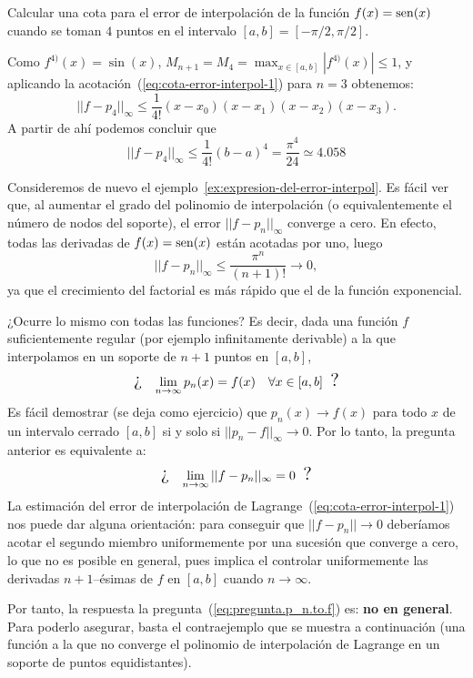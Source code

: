 \begin{example}
  \label{ex:expresion-del-error-interpol}
  Calcular una cota para el error de interpolación de la función
  $f(x)=\operatorname{sen}(x)$ cuando se toman $4$ puntos en el intervalo $[a,b]=[-\pi/2,\pi/2]$.

  Como $f^{4)}(x)=\sin(x)$, $M_{n+1}=M_4=\max_{x\in
    [a,b]}|f^{4)}(x)|\le 1$, y aplicando la
  acotación~(\ref{eq:cota-error-interpol-1}) para $n=3$ obtenemos:
  \begin{equation*}
    ||f-p_4||_\infty \le \frac{1}{4!}(x-x_0)(x-x_1)(x-x_2)(x-x_3).
  \end{equation*}
  A partir de ahí podemos concluir que
  \begin{equation*}
    ||f-p_4||_\infty \le \frac{1}{4!}(b-a)^4 = \frac{\pi^4}{24}
    \simeq 4.058
  \end{equation*}
\end{example}
\begin{remark}
  Consideremos de nuevo el
  ejemplo~\ref{ex:expresion-del-error-interpol}. Es fácil ver que, al
  aumentar el grado del polinomio de interpolación (o equivalentemente
  el número de nodos del soporte), el error $||f-p_n||_\infty$
  converge a cero. En efecto, todas las derivadas de $f(x)=\operatorname{sen}(x)$
  están acotadas por uno, luego
  \begin{equation*}
    ||f-p_n||_\infty\le \frac{\pi^n}{(n+1)!} \to 0,
  \end{equation*}
  ya que el crecimiento del factorial es más rápido que el de la
  función exponencial.

  ¿Ocurre lo mismo con todas las funciones? Es decir, dada una
  función $f$ suficientemente regular (por ejemplo infinitamente
  derivable) a la que interpolamos en un soporte de $n+1$ puntos en
  $[a,b]$,
  \begin{equation}
    \text{\Large ¿ \;}
    \lim_{n\to\infty} p_n(x) = f(x) \quad \forall x\in [a,b]
    \text{\; \Large?}
    \label{eq:pregunta.p_n.to.f}
  \end{equation}
  Es fácil demostrar (se deja como ejercicio) que $p_n(x)\to f(x)$
  para todo $x$ de un intervalo cerrado $[a,b]$ si y solo si $||p_n -
  f||_\infty\to 0$. Por lo tanto, la pregunta anterior es equivalente
  a:
  \begin{equation*}
    \text{\Large ¿ \;}
    \lim_{n\to\infty} ||f-p_n||_\infty=0
    \text{\; \Large ?}
  \end{equation*}
  La estimación del error de interpolación de
  Lagrange~(\ref{eq:cota-error-interpol-1}) nos puede dar alguna
  orientación: para conseguir que
  $||f-p_n||\to 0$ deberíamos acotar el segundo miembro uniformemente
  por una sucesión que converge a cero, lo que no es posible en
  general, pues implica el controlar uniformemente las derivadas
  $n+1$--ésimas de $f$ en $[a,b]$ cuando $n\to \infty$.

  Por tanto, la respuesta la pregunta~(\ref{eq:pregunta.p_n.to.f}) es:
  \textbf{no en general}. Para poderlo asegurar, basta el
  contraejemplo que se muestra a continuación (una función a la que no
  converge el polinomio de interpolación de Lagrange en un soporte de
  puntos equidistantes).
\end{remark}

